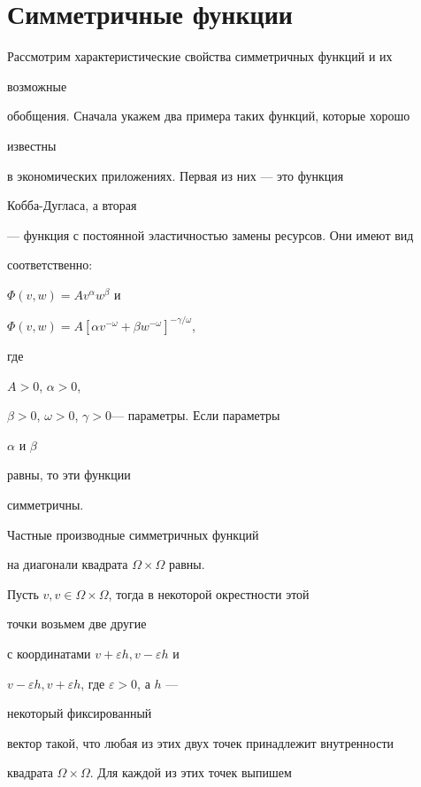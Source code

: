 \section{Симметричные функции}





Рассмотрим характеристические свойства симметричных функций и их


возможные


обобщения. Сначала укажем два примера таких функций, которые хорошо


известны


в экономических приложениях. Первая из них --- это функция


Кобба-Дугласа, а вторая


--- функция с постоянной эластичностью замены ресурсов. Они имеют вид


соответственно:


$\Phi(v,w)=Av^\alpha w^\beta$ и


$\Phi(v,w)=A[\alpha v^{-\omega}+\beta w^{-\omega}]^{-\gamma/\omega}$,


где


$A>0$, $\alpha>0$,


$\beta>0$, $\omega>0$, $\gamma>0$--- параметры. Если параметры


$\alpha$ и $\beta$


равны, то эти функции


симметричны.





\begin{pty} Частные производные симметричных функций


на диагонали квадрата $\Omega\times\Omega$ равны.


\end{pty}





Пусть $v,v\in\Omega\times\Omega$, тогда в некоторой окрестности этой


точки возьмем две другие


с координатами $v+\varepsilon h,v-\varepsilon h$ и


$v-\varepsilon h,v+\varepsilon h$, где $\varepsilon>0$, а $h$ ---


некоторый фиксированный


вектор такой, что любая из этих двух точек принадлежит внутренности


квадрата $\Omega\times\Omega$. Для каждой из этих точек выпишем


